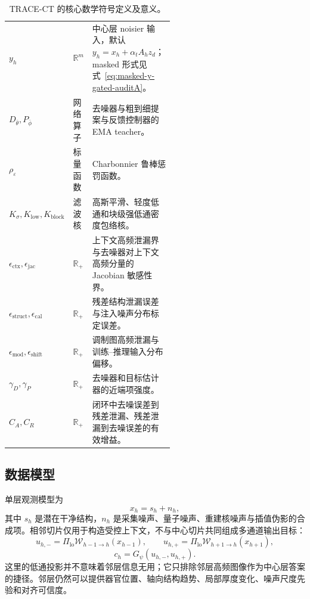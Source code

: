 \documentclass[11pt,a4paper,UTF8,fontset=fandol]{ctexart}
\theoremstyle{definition}
\begin{document}
\begin{table}[htbp]
\begin{tabular}{llp{0.55\linewidth}}
$y_h$ & $\mathbb R^m$ & 中心层 noisier 输入，默认 $y_h=x_h+\alpha_tA_hz_d$；masked 形式见式~\eqref{eq:masked-y-gated-auditA}。 \\
$D_{\bar\theta},P_{\bar\phi}$ & 网络算子 & 去噪器与粗到细提案与反馈控制器的 EMA teacher。 \\
$\rho_\varepsilon$ & 标量函数 & Charbonnier 鲁棒惩罚函数。 \\
$K_\sigma,K_{\mathrm{low}},K_{\mathrm{block}}$ & 滤波核 & 高斯平滑、轻度低通和块级强低通密度包络核。 \\
$\epsilon_{\mathrm{ctx}},\epsilon_{\mathrm{jac}}$ & $\mathbb R_+$ & 上下文高频泄漏界与去噪器对上下文高频分量的 Jacobian 敏感性界。 \\
$\epsilon_{\mathrm{struct}},\epsilon_{\mathrm{cal}}$ & $\mathbb R_+$ & 残差结构泄漏误差与注入噪声分布标定误差。 \\
$\epsilon_{\mathrm{mod}},\epsilon_{\mathrm{shift}}$ & $\mathbb R_+$ & 调制图高频泄漏与训练--推理输入分布偏移。 \\
$\gamma_D,\gamma_P$ & $\mathbb R_+$ & 去噪器和目标估计器的近端项强度。 \\
$C_A,C_R$ & $\mathbb R_+$ & 闭环中去噪误差到残差泄漏、残差泄漏到去噪误差的有效增益。 \\
\bottomrule
\end{tabular}
\caption{TRACE-CT 的核心数学符号定义及意义。}
\label{tab:symbols-coreA}
\end{table}

\subsection{数据模型}

单层观测模型为
\begin{equation}
\label{eq:observation-model}
    x_h=s_h+n_h,
\end{equation}
其中 $s_h$ 是潜在干净结构，$n_h$ 是采集噪声、量子噪声、重建核噪声与插值伪影的合成项。相邻切片仅用于构造受控上下文，不与中心切片共同组成多通道输出目标：
\begin{equation}
\label{eq:context-construction-coreA}
    u_{h,-}=\Pi_{\mathrm{lo}}\mathcal W_{h-1\to h}(x_{h-1}),
    \qquad
    u_{h,+}=\Pi_{\mathrm{lo}}\mathcal W_{h+1\to h}(x_{h+1}),
\end{equation}
\begin{equation}
\label{eq:context-encoder-coreA}
    c_h=G_\psi(u_{h,-},u_{h,+}).
\end{equation}
这里的低通投影并不意味着邻层信息无用；它只排除邻层高频图像作为中心层答案的捷径。邻层仍然可以提供器官位置、轴向结构趋势、局部厚度变化、噪声尺度先验和对齐可信度。
\end{document}
